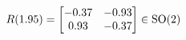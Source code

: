 \documentclass[preview]{standalone}
\begin{document}
\begin{align*}
\special{dvisvgm:raw <g id='unique000'>}R(1.95) = \begin{bmatrix} -0.37 & -0.93 \\ 0.93 & -0.37 \end{bmatrix} \in \text{SO}(2)\special{dvisvgm:raw </g>}
\end{align*}
\end{document}
